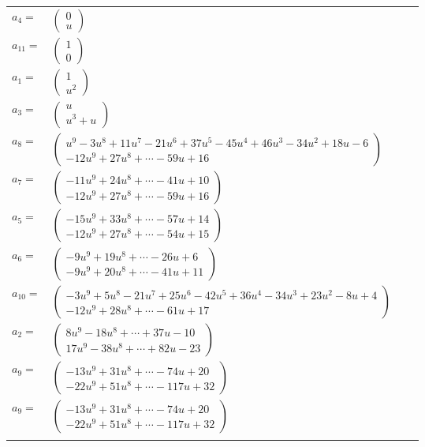 \documentclass[1p]{elsarticle_modified}
\theoremstyle{definition}
\begin{document}
\begin{tabular}{m{7pt} m{180pt} m{7pt} m{180pt} }
\flushright $a_{4}=$&$\begin{pmatrix}0\\u\end{pmatrix}$ \\
\flushright $a_{11}=$&$\begin{pmatrix}1\\0\end{pmatrix}$ \\
\flushright $a_{1}=$&$\begin{pmatrix}1\\u^2\end{pmatrix}$ \\
\flushright $a_{3}=$&$\begin{pmatrix}u\\u^3+u\end{pmatrix}$ \\
\flushright $a_{8}=$&$\begin{pmatrix}u^9-3 u^8+11 u^7-21 u^6+37 u^5-45 u^4+46 u^3-34 u^2+18 u-6\\-12 u^9+27 u^8+\cdots-59 u+16\end{pmatrix}$ \\
\flushright $a_{7}=$&$\begin{pmatrix}-11 u^9+24 u^8+\cdots-41 u+10\\-12 u^9+27 u^8+\cdots-59 u+16\end{pmatrix}$ \\
\flushright $a_{5}=$&$\begin{pmatrix}-15 u^9+33 u^8+\cdots-57 u+14\\-12 u^9+27 u^8+\cdots-54 u+15\end{pmatrix}$ \\
\flushright $a_{6}=$&$\begin{pmatrix}-9 u^9+19 u^8+\cdots-26 u+6\\-9 u^9+20 u^8+\cdots-41 u+11\end{pmatrix}$ \\
\flushright $a_{10}=$&$\begin{pmatrix}-3 u^9+5 u^8-21 u^7+25 u^6-42 u^5+36 u^4-34 u^3+23 u^2-8 u+4\\-12 u^9+28 u^8+\cdots-61 u+17\end{pmatrix}$ \\
\flushright $a_{2}=$&$\begin{pmatrix}8 u^9-18 u^8+\cdots+37 u-10\\17 u^9-38 u^8+\cdots+82 u-23\end{pmatrix}$ \\
\flushright $a_{9}=$&$\begin{pmatrix}-13 u^9+31 u^8+\cdots-74 u+20\\-22 u^9+51 u^8+\cdots-117 u+32\end{pmatrix}$\\ \flushright $a_{9}=$&$\begin{pmatrix}-13 u^9+31 u^8+\cdots-74 u+20\\-22 u^9+51 u^8+\cdots-117 u+32\end{pmatrix}$\\&\end{tabular}
\end{document}

